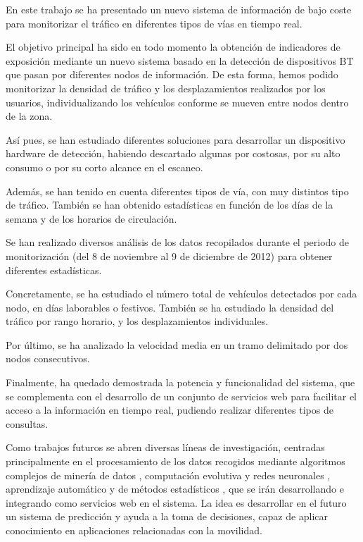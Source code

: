 \documentclass[twocolumn,twoside]{Jornadas}
\begin{document}
En este trabajo se ha presentado un nuevo sistema de información de bajo coste para monitorizar el tráfico en diferentes tipos de vías en tiempo real.

El objetivo principal ha sido en todo momento la obtención de indicadores de exposición mediante un nuevo sistema basado en la detección de dispositivos BT que pasan por diferentes nodos de información.
De esta forma, hemos podido monitorizar la densidad de tráfico y los desplazamientos realizados por los usuarios, individualizando los vehículos conforme se mueven entre nodos dentro de la zona.

Así pues, se han estudiado diferentes soluciones para desarrollar un dispositivo hardware de detección, habiendo descartado algunas por costosas, por su alto consumo o por su corto alcance en el escaneo.

Además, se han tenido en cuenta diferentes tipos de vía, con muy distintos tipo de tráfico. 
También se han obtenido estadísticas en función de los días de la semana y de los horarios de circulación.


Se han realizado diversos análisis de los datos recopilados durante el periodo de monitorización (del 8 de noviembre al 9 de diciembre de 2012) para obtener diferentes estadísticas.

Concretamente, se ha estudiado el número total de vehículos detectados por cada nodo, en días laborables o festivos. También se ha estudiado la densidad del tráfico por rango horario, y los desplazamientos individuales.

Por último, se ha analizado la velocidad media en un tramo delimitado por dos nodos consecutivos.


Finalmente, ha quedado demostrada la potencia y funcionalidad del sistema, que se complementa con el desarrollo de un conjunto de servicios web para facilitar el acceso a la información en tiempo real, pudiendo realizar diferentes tipos de consultas.


Como trabajos futuros se abren diversas líneas de investigación, centradas principalmente en el procesamiento de los datos recogidos mediante algoritmos complejos de minería de datos \cite{Trevor2009}, computación evolutiva \cite{Eiben2003,Michalewicz2004,Yang2010} y redes neuronales \cite{Castillo2001,Rivas2003,Castillo2007}, aprendizaje automático \cite{Arenas2005} y de métodos estadísticos \cite{Jiawei2006,Hill2007,Nisbet2009}, que se irán desarrollando e integrando como servicios web \cite{Papazoglou2007,pgs2007} en el sistema.
La idea es desarrollar en el futuro un sistema de predicción y ayuda a la toma de decisiones, capaz de aplicar conocimiento en aplicaciones relacionadas con la movilidad. 
\end{document}
